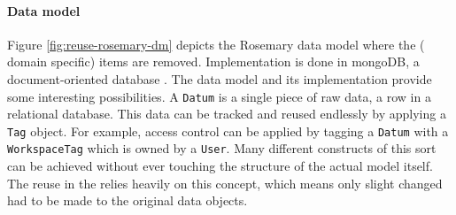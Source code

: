 \paragraph{Data model}
Figure \ref{fig:reuse-rosemary-dm} depicts the Rosemary data model where the (\ie{} domain specific) items are removed.
Implementation is done in mongoDB, a document-oriented database \cite{}.
The data model and its implementation provide some interesting possibilities.
A {\tt Datum} is a single piece of raw data, \ie{} a row in a relational database.
This data can be tracked and reused endlessly by applying a {\tt Tag} object.
For example, access control can be applied by tagging a {\tt Datum} with a {\tt WorkspaceTag} which is owned by a {\tt User}.
Many different constructs of this sort can be achieved without ever touching the structure of the actual model itself.
The reuse in the \ivfsystem{} relies heavily on this concept, which means only slight changed had to be made to the original data objects.